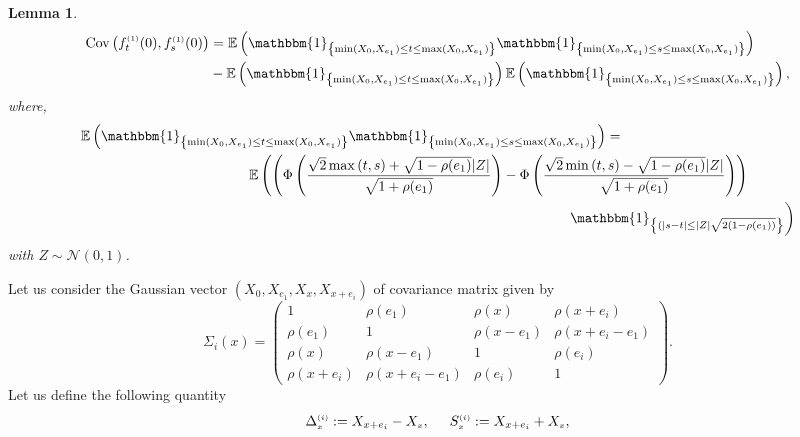 \documentclass[12pt]{article}
\theoremstyle{Theorem}
\newtheorem{Lemma}[Theorem]{Lemma}
\begin{document}
\begin{Lemma}
\begin{align*}
\text{Cov}\left(f_{t}^{\scriptscriptstyle (1)}(0), f_{s}^{\scriptscriptstyle (1)}(0)\right) & = \mathbb{E}\left(\mathbbm{1}_{\left\{\min(X_{\scriptscriptstyle 0}, X_{\scriptscriptstyle  e_1}) \leq t \leq \max(X_{\scriptscriptstyle 0}, X_{e_1})\right\}}\mathbbm{1}_{\left\{\min(X_{\scriptscriptstyle 0}, X_{ \scriptscriptstyle  e_1}) \leq s \leq \max(X_{\scriptscriptstyle 0}, X_{\scriptscriptstyle e_1}) \right\}}\right) \\
& - \mathbb{E}\left(\mathbbm{1}_{\left\{\min(X_{\scriptscriptstyle 0}, X_{e_1}) \leq t \leq \max(X_{\scriptscriptstyle 0}, X_{e_1})\right\}}\right)\mathbb{E}\left(\mathbbm{1}_{\left\{\min(X_{\scriptscriptstyle 0}, X_{e_1}) \leq s \leq \max(X_{\scriptscriptstyle 0}, X_{e_1})\right\}}\right),
\end{align*}
where, 
{\small
\begin{align*}
\mathbb{E}\left(\mathbbm{1}_{\left\{\min(X_{\scriptscriptstyle 0}, X_{\scriptscriptstyle  e_1}) \leq t \leq \max(X_{\scriptscriptstyle 0}, X_{e_1})\right\}}\mathbbm{1}_{\left\{\min(X_{\scriptscriptstyle 0}, X_{ \scriptscriptstyle  e_1}) \leq s \leq \max(X_{\scriptscriptstyle 0}, X_{\scriptscriptstyle e_1}) \right\}}\right) & = \\
& \hspace{-9cm}\mathbb{E}\left(\left(\Phi\left(\dfrac{\sqrt{2}\max\left(t,s\right) + \sqrt{1-\rho(e_1)}|Z|}{\sqrt{1+\rho(e_1)}}\right)  - \Phi\left(\dfrac{\sqrt{2}\min\left(t,s\right) - \sqrt{1-\rho(e_1)}|Z|}{\sqrt{1+\rho(e_1)}}\right)\right)\right. \\
& \hspace{-1cm} \left.\mathbbm{1}_{\left\{(|s-t| \leq |Z|\sqrt{2(1-\rho(e_1))}\right\}}\right)
\end{align*}}
with $Z \sim \mathcal{N}(0,1)$. 
\end{Lemma}
Let us consider the Gaussian vector $\left(X_{\scriptscriptstyle 0}, X_{e_1}, X_{\scriptscriptstyle x}, X_{x+e_i}\right)$ of covariance matrix given by $$\Sigma_{i}(x) = \begin{pmatrix} 1 & \rho(e_1) & \rho(x) & \rho(x+e_i)\\
\rho(e_1) & 1 & \rho(x-e_1) &  \rho(x+e_i- e_1) \\ 
\rho(x) & \rho(x-e_1) & 1 & \rho(e_i) \\
\rho(x+e_i) & \rho(x+e_i-e_1) & \rho(e_i) & 1 \end{pmatrix}.$$ 
Let us define the following quantity  \begin{equation} \label{expressions} \Delta^{\scriptscriptstyle (i)}_{\scriptscriptstyle x} := X_{x+e_i} - X_{\scriptscriptstyle x}, \hspace{0.5cm} S^{\scriptscriptstyle (i)}_{\scriptscriptstyle x} := X_{x+e_i} + X_{\scriptscriptstyle x},\end{equation}
\end{document}
